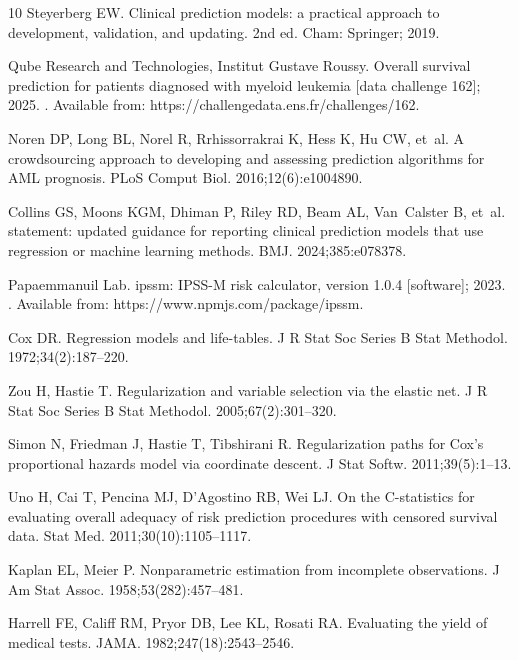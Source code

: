 \documentclass[10pt,letterpaper]{article}
\begin{document}
\begin{thebibliography}{10}
Steyerberg EW.
\newblock Clinical prediction models: a practical approach to development,
  validation, and updating.
\newblock 2nd ed. Cham: Springer; 2019.

{Qube Research and Technologies}, {Institut Gustave Roussy}. Overall survival
  prediction for patients diagnosed with myeloid leukemia [data challenge 162];
  2025.
. Available from:
  https://challengedata.ens.fr/challenges/162.

Noren DP, Long BL, Norel R, Rrhissorrakrai K, Hess K, Hu CW, et~al.
\newblock A crowdsourcing approach to developing and assessing prediction
  algorithms for {AML} prognosis.
\newblock PLoS Comput Biol. 2016;12(6):e1004890.

Collins GS, Moons KGM, Dhiman P, Riley RD, Beam AL, Van~Calster B, et~al.
 statement: updated guidance for reporting clinical
  prediction models that use regression or machine learning methods.
\newblock BMJ. 2024;385:e078378.

{Papaemmanuil Lab}. ipssm: {IPSS-M} risk calculator, version 1.0.4 [software];
  2023.
. Available from:
  https://www.npmjs.com/package/ipssm.

Cox DR.
\newblock Regression models and life-tables.
\newblock J R Stat Soc Series B Stat Methodol. 1972;34(2):187--220.

Zou H, Hastie T.
\newblock Regularization and variable selection via the elastic net.
\newblock J R Stat Soc Series B Stat Methodol. 2005;67(2):301--320.

Simon N, Friedman J, Hastie T, Tibshirani R.
\newblock Regularization paths for {Cox's} proportional hazards model via
  coordinate descent.
\newblock J Stat Softw. 2011;39(5):1--13.

Uno H, Cai T, Pencina MJ, D'Agostino RB, Wei LJ.
\newblock On the {C}-statistics for evaluating overall adequacy of risk
  prediction procedures with censored survival data.
\newblock Stat Med. 2011;30(10):1105--1117.

Kaplan EL, Meier P.
\newblock Nonparametric estimation from incomplete observations.
\newblock J Am Stat Assoc. 1958;53(282):457--481.

Harrell FE, Califf RM, Pryor DB, Lee KL, Rosati RA.
\newblock Evaluating the yield of medical tests.
\newblock JAMA. 1982;247(18):2543--2546.


\end{thebibliography}
\end{document}
